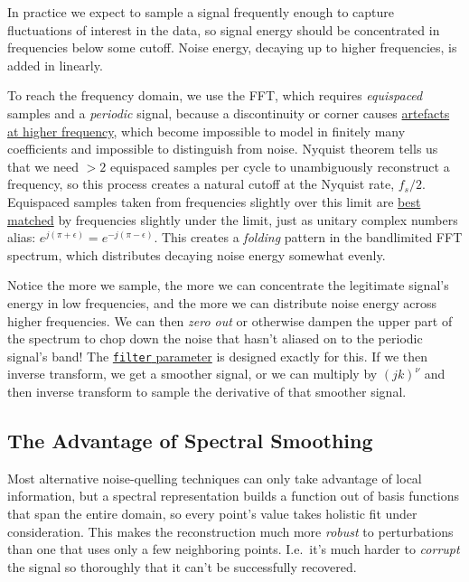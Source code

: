 \documentclass[10pt]{article}
\begin{document}
In practice we expect to sample a signal frequently enough to capture fluctuations of interest in the data, so signal energy should be concentrated in frequencies below some cutoff.  Noise energy, decaying up to higher frequencies, is added in linearly.

To reach the frequency domain, we use the FFT, which requires \textit{equispaced} samples and a \textit{periodic} signal, because a discontinuity or corner causes \hyperref[artefacts]{artefacts at higher frequency}, which become impossible to model in finitely many coefficients and impossible to distinguish from noise. Nyquist theorem\cite{oppenheim} tells us that we need $>\!2$ equispaced samples per cycle to unambiguously reconstruct a frequency, so this process creates a natural cutoff at the Nyquist rate, $f_s/2$. Equispaced samples taken from frequencies slightly over this limit are \hyperref[bandlimited]{best matched} by frequencies slightly under the limit, just as unitary complex numbers alias: $e^{j(\pi + \epsilon)} = e^{-j(\pi - \epsilon)}$. This creates a \textit{folding} pattern in the bandlimited FFT spectrum, which distributes decaying noise energy somewhat evenly.

Notice the more we sample, the more we can concentrate the legitimate signal's energy in low frequencies, and the more we can distribute noise energy across higher frequencies. We can then \textit{zero out} or otherwise dampen the upper part of the spectrum to chop down the noise that hasn't aliased on to the periodic signal's band! The \href{http://pavelkomarov.com/spectral-derivatives/specderiv.html}{\texttt{filter} parameter} is designed exactly for this. If we then inverse transform, we get a smoother signal, or we can multiply by $(jk)^\nu$ and then inverse transform to sample the derivative of that smoother signal.

\subsection{The Advantage of Spectral Smoothing}

Most alternative noise-quelling techniques can only take advantage of local information, but a spectral representation builds a function out of basis functions that span the entire domain, so every point's value takes holistic fit under consideration. This makes the reconstruction much more \textit{robust} to perturbations than one that uses only a few neighboring points. I.e.~it's much harder to \textit{corrupt} the signal so thoroughly that it can't be successfully recovered.
\end{document}
